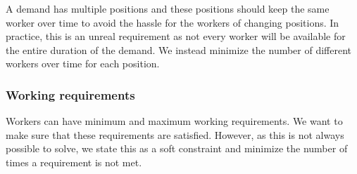 \documentclass[../thesis.tex]{subfiles}
\begin{document}
A demand has multiple positions and these positions should keep the same worker over time to avoid the hassle for the workers of changing positions. In practice,
this is an unreal requirement as not every worker will be available for the entire duration of the demand. 
We instead minimize the number of different workers over time for each position.

\subsubsection{Working requirements}

Workers can have minimum and maximum working requirements. We want to make sure 
that these requirements are satisfied. However, as this is not always possible to solve, we 
state this as a soft constraint and minimize the number of times a requirement is not met.
\end{document}
